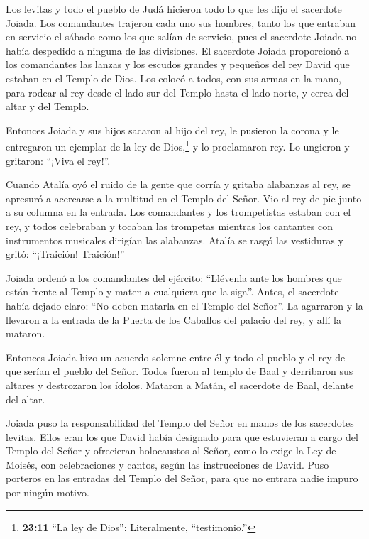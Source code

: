  Los levitas y todo el pueblo de Judá hicieron todo lo que
les dijo el sacerdote Joiada. Los comandantes trajeron cada uno sus
hombres, tanto los que entraban en servicio el sábado como los que
salían de servicio, pues el sacerdote Joiada no había despedido a
ninguna de las divisiones.  El sacerdote Joiada proporcionó
a los comandantes las lanzas y los escudos grandes y pequeños del rey
David que estaban en el Templo de Dios.  Los colocó a
todos, con sus armas en la mano, para rodear al rey desde el lado sur
del Templo hasta el lado norte, y cerca del altar y del Templo.

 Entonces Joiada y sus hijos sacaron al hijo del rey, le
pusieron la corona y le entregaron un ejemplar de la ley de
Dios,\footnote{\textbf{23:11} ``La ley de Dios'': Literalmente,
  ``testimonio.''} y lo proclamaron rey. Lo ungieron y gritaron: ``¡Viva
el rey!''.

 Cuando Atalía oyó el ruido de la gente que corría y
gritaba alabanzas al rey, se apresuró a acercarse a la multitud en el
Templo del Señor.  Vio al rey de pie junto a su columna en
la entrada. Los comandantes y los trompetistas estaban con el rey, y
todos celebraban y tocaban las trompetas mientras los cantantes con
instrumentos musicales dirigían las alabanzas. Atalía se rasgó las
vestiduras y gritó: ``¡Traición! Traición!''

 Joiada ordenó a los comandantes del ejército: ``Llévenla
ante los hombres que están frente al Templo y maten a cualquiera que la
siga''. Antes, el sacerdote había dejado claro: ``No deben matarla en el
Templo del Señor''.  La agarraron y la llevaron a la
entrada de la Puerta de los Caballos del palacio del rey, y allí la
mataron.

 Entonces Joiada hizo un acuerdo solemne entre él y todo el
pueblo y el rey de que serían el pueblo del Señor.  Todos
fueron al templo de Baal y derribaron sus altares y destrozaron los
ídolos. Mataron a Matán, el sacerdote de Baal, delante del altar.

 Joiada puso la responsabilidad del Templo del Señor en
manos de los sacerdotes levitas. Ellos eran los que David había
designado para que estuvieran a cargo del Templo del Señor y ofrecieran
holocaustos al Señor, como lo exige la Ley de Moisés, con celebraciones
y cantos, según las instrucciones de David.  Puso porteros
en las entradas del Templo del Señor, para que no entrara nadie impuro
por ningún motivo.


